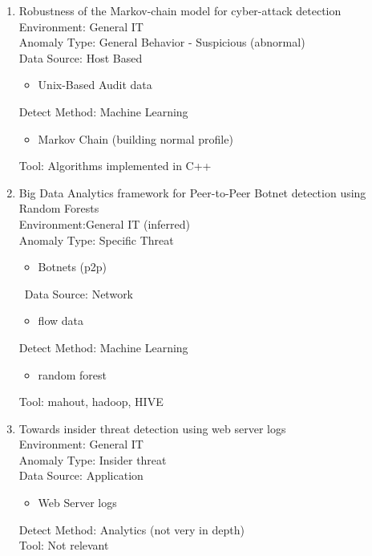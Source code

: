 \documentclass[10pt]{IEEEtran}
\begin{document}
\begin{enumerate}
    
    \item 
    Robustness of the Markov-chain model for cyber-attack detection\cite{ye2004robustness}\\
    Environment: General IT\\
    Anomaly Type: General Behavior - Suspicious (abnormal) \\
    Data Source: Host Based\\
    \begin{itemize}
        \item Unix-Based Audit data
    \end{itemize}
    Detect Method: Machine Learning \\
    \begin{itemize}
        \item Markov Chain (building normal profile)
    \end{itemize}
    Tool: Algorithms implemented in C++
    
    \item 
    Big Data Analytics framework for Peer-to-Peer Botnet detection using Random Forests\cite{singh2014big}\\
    Environment:General IT (inferred)\\
    Anomaly Type: Specific Threat
    \begin{itemize}
        \item Botnets (p2p)
    \end{itemize}\
    Data Source: Network 
    \begin{itemize}
        \item flow data
    \end{itemize}
    Detect Method: Machine Learning 
    \begin{itemize}
        \item random forest
    \end{itemize}
    Tool: mahout, hadoop, HIVE 
    
    \item 
    Towards insider threat detection using web server logs\cite{myers2009towards}\\
    Environment: General IT \\
    Anomaly Type: Insider threat \\
    Data Source: Application
    \begin{itemize}
        \item Web Server logs
    \end{itemize}
    Detect Method: Analytics (not very in depth)\\ 
    Tool: Not relevant
    

\end{enumerate}
\end{document}
